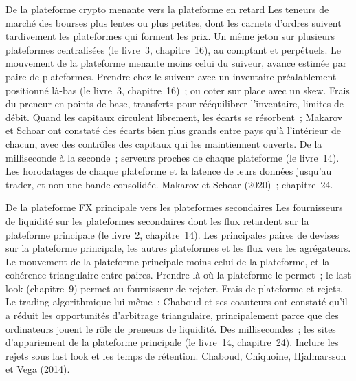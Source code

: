 \begin{strategyfile}{De la plateforme crypto menante vers la plateforme en retard}\label{strat:hf:lead-lag-and-cross-venue-trading:crypto}
 Les teneurs de marché des bourses plus lentes ou plus petites, dont les carnets d'ordres suivent tardivement les plateformes qui forment les prix.
 Un même jeton sur plusieurs plateformes centralisées (le livre~3, chapitre~16), au comptant et perpétuels.
 Le mouvement de la plateforme menante moins celui du suiveur, avance estimée par paire de plateformes.
 Prendre chez le suiveur avec un inventaire préalablement positionné là-bas (le livre~3, chapitre~16)~; ou coter sur place avec un skew.
 Frais du preneur en points de base, transferts pour rééquilibrer l'inventaire, limites de débit.
 Quand les capitaux circulent librement, les écarts se résorbent~; Makarov et Schoar ont constaté des écarts bien plus grands entre pays qu'à l'intérieur de chacun, avec
des contrôles des capitaux qui les maintiennent ouverts.
 De la milliseconde à la seconde~; serveurs proches de chaque plateforme (le livre~14).
 Les horodatages de chaque plateforme et la latence de leurs données jusqu'au trader, et non une bande consolidée.
 Makarov et Schoar (2020)~; chapitre~24.
\end{strategyfile}

\begin{strategyfile}{De la plateforme FX principale vers les plateformes secondaires}\label{strat:hf:lead-lag-and-cross-venue-trading:fx}
 Les fournisseurs de liquidité sur les plateformes secondaires dont les flux retardent sur la plateforme principale (le livre~2, chapitre~14).
 Les principales paires de devises sur la plateforme principale, les autres plateformes et les flux vers les agrégateurs.
 Le mouvement de la plateforme principale moins celui de la plateforme, et la cohérence triangulaire entre paires.
 Prendre là où la plateforme le permet~; le last look (chapitre~9) permet au fournisseur de rejeter.
 Frais de plateforme et rejets.
 Le trading algorithmique lui-même~: Chaboud et ses coauteurs ont constaté qu'il a réduit les opportunités d'arbitrage triangulaire, principalement parce que des ordinateurs
jouent le rôle de preneurs de liquidité.
 Des millisecondes~; les sites d'appariement de la plateforme principale (le livre~14, chapitre~24).
 Inclure les rejets sous last look et les temps de rétention.
 Chaboud, Chiquoine, Hjalmarsson et Vega (2014).
\end{strategyfile}

